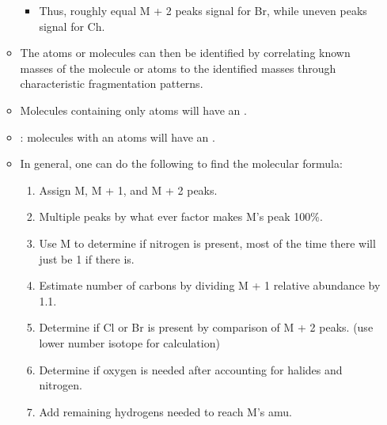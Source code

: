 \begin{itemize}
\begin{itemize}
\begin{itemize}
          \item Thus, roughly equal M + 2 peaks signal for Br, while uneven peaks signal for Ch.
        \end{itemize}
      \item The atoms or molecules can then be identified by correlating known masses of the molecule or atoms to the identified masses through characteristic fragmentation patterns.
      \item Molecules containing only  atoms will have an .
      \item {}: molecules with an  atoms will have an .
      \item In general, one can do the following to find the molecular formula:
        \begin{enumerate}
          \item Assign M, M + 1, and M + 2 peaks.
          \item Multiple peaks by what ever factor makes M's peak 100\%.
          \item Use M to determine if nitrogen is present, most of the time there will just be 1 if there is.
          \item Estimate number of carbons by dividing M + 1 relative abundance by 1.1.
          \item Determine if Cl or Br is present by comparison of M + 2 peaks. (use lower number isotope for calculation)
          \item Determine if oxygen is needed after accounting for halides and nitrogen. 
          \item Add remaining hydrogens needed to reach M's amu.
        \end{enumerate}
    \end{itemize}
  
\end{itemize}
